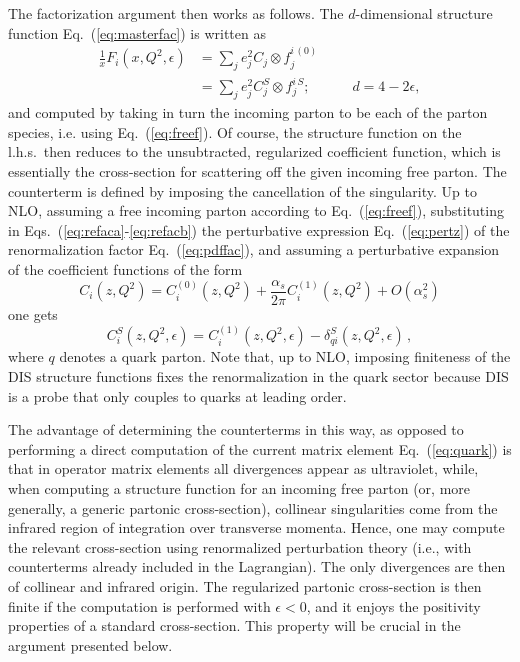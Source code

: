 The factorization argument then works as follows. The $d$-dimensional structure
function Eq.~(\ref{eq:masterfac}) is
written as
\begin{align} \label{eq:refaca}
 \frac{1}{x} F_i(x,Q^2,\epsilon)&=\sum_{j} e^2_j C_j \otimes f_j^{i\,(0)} \\
&=\sum_{j} e^2_j C_j^S \otimes f_j^{i\,S};\qquad\quad d=4-2\epsilon,
\label{eq:refacb}
\end{align}
and computed by taking in turn  the incoming parton to be each of the
parton species, i.e. using Eq.~(\ref{eq:freef}).
  Of course, the structure
function on the l.h.s.\ then reduces to the
unsubtracted, regularized coefficient
function, which is essentially the cross-section for scattering off
the given incoming free parton. The counterterm is defined by imposing the
cancellation of the singularity. Up to NLO, assuming a free incoming
parton according to Eq.~(\ref{eq:freef}), substituting in
Eqs.~(\ref{eq:refaca}-\ref{eq:refacb}) the
perturbative expression Eq.~(\ref{eq:pertz}) of the 
renormalization factor Eq.~(\ref{eq:pdffac}), and assuming a
perturbative expansion of the coefficient functions of the form
\begin{equation}\label{eq:perc}
  C_i(z,Q^2)= C^{(0)}_i(z,Q^2)+\frac{\alpha_s}{2\pi} C^{(1)}_i(z,Q^2)+O(\alpha_s^2)
\end{equation} 
one gets
\begin{equation}\label{eq:renorm}
    C_i^S(z,Q^2,\epsilon) = 
    {C^{(1)}_{i}}(z,Q^2,\epsilon)
    -\delta_{qi}^S(z,Q^2,\epsilon)\,,
\end{equation}
where $q$ denotes a quark parton.
Note that, up to NLO, imposing finiteness of the DIS structure
functions fixes the renormalization in the quark sector because DIS is
a probe that only couples to quarks at leading order.

The advantage of determining the counterterms in this way, as opposed
to performing a direct computation of the current matrix element
Eq.~(\ref{eq:quark}) is that in  operator matrix
elements all divergences appear as ultraviolet, while, when computing a
structure function for an incoming free parton  (or, more
generally, a generic partonic cross-section), collinear singularities
come from the infrared region of integration over
transverse momenta. Hence, one may compute the relevant
cross-section using renormalized perturbation theory (i.e., with
counterterms already included in the Lagrangian). The only divergences
are then of collinear and infrared origin.
The regularized partonic cross-section is
then finite if the computation is
performed with $\epsilon<0$, and it enjoys the positivity
properties of a standard 
cross-section. This property will be crucial in the argument presented
 below.

